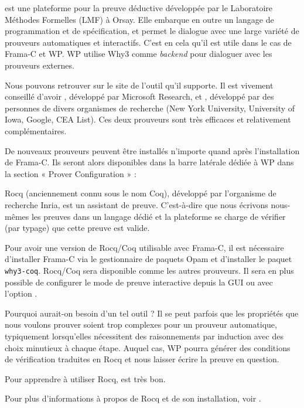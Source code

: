 

 est une plateforme pour la preuve
déductive développée par le Laboratoire Méthodes Formelles (LMF) à Orsay. Elle
embarque en outre un langage de programmation et de spécification, et permet le
dialogue avec une large variété de prouveurs automatiques et interactifs. C'est
en cela qu'il est utile dans le cas de Frama-C et WP. WP utilise Why3 comme
\textit{backend} pour dialoguer avec les prouveurs externes.


Nous pouvons retrouver sur le site de l'outil
 qu'il supporte.
Il est vivement conseillé d'avoir ,
développé par Microsoft Research, et ,
développé par des personnes de divers organismes de recherche (New York
University, University of Iowa, Google, CEA List). Ces deux prouveurs sont très
efficaces et relativement complémentaires.



De nouveaux prouveurs peuvent être installés n'importe quand après
l'installation de Frama-C. Ils seront alors disponibles dans la barre latérale
dédiée à WP dans la section « Prover Configuration » :






Rocq (anciennement connu sous le nom Coq), développé par l'organisme de
recherche Inria, est un assistant de preuve. C'est-à-dire que nous écrivons
nous-mêmes les preuves dans un langage dédié et la plateforme se charge de
vérifier (par typage) que cette preuve est valide.


Pour avoir une version de Rocq/Coq utilisable avec Frama-C, il est nécessaire
d'installer Frama-C via le gestionnaire de paquets Opam et d'installer le
paquet \texttt{why3-coq}. Rocq/Coq sera disponible comme les autres prouveurs.
Il sera en plus possible de configurer le mode de preuve interactive depuis la
GUI ou avec l'option .


Pourquoi aurait-on besoin d'un tel outil ? Il se peut parfois que les
propriétés que nous voulons prouver soient trop complexes pour un prouveur
automatique, typiquement lorsqu'elles nécessitent des raisonnements par
induction avec des choix minutieux à chaque étape. Auquel cas, WP pourra
générer des conditions de vérification traduites en Rocq et nous laisser écrire
la preuve en question.


Pour apprendre à utiliser Rocq,
est très bon.


Pour plus d'informations à propos de Rocq et de son installation, voir
.

